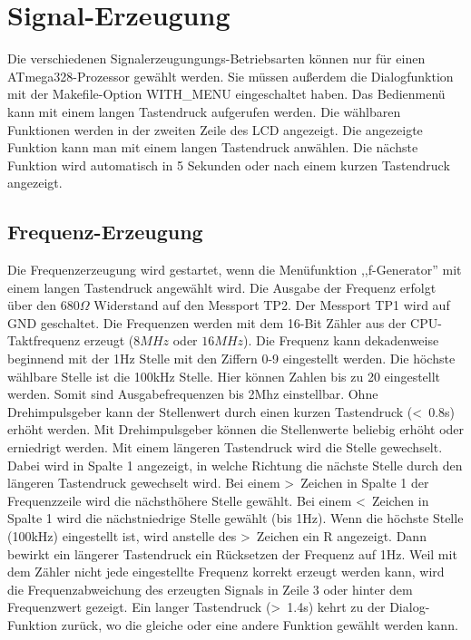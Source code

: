 \chapter{Signal-Erzeugung}

Die verschiedenen Signalerzeugungungs-Betriebsarten können nur für einen ATmega328-Prozessor
gewählt werden.
Sie müssen außerdem die Dialogfunktion mit der Makefile-Option WITH\_MENU eingeschaltet haben.
Das Bedienmenü kann mit einem langen Tastendruck aufgerufen werden.
Die wählbaren Funktionen werden in der zweiten Zeile des LCD angezeigt.
Die angezeigte Funktion kann man mit einem langen Tastendruck anwählen.
Die nächste Funktion wird automatisch in 5 Sekunden oder nach einem kurzen Tastendruck
angezeigt.

\label{sec:generation}

\section{Frequenz-Erzeugung}
Die Frequenzerzeugung wird gestartet, wenn die Menüfunktion ,,f-Generator'' mit einem
langen Tastendruck angewählt wird.
Die Ausgabe der Frequenz erfolgt über den \(680\Omega\) Widerstand auf den Messport TP2.
Der Messport TP1 wird auf GND geschaltet.
Die Frequenzen werden mit dem 16-Bit Zähler aus der CPU-Taktfrequenz erzeugt (\(8MHz\) oder \(16MHz\)).
Die Frequenz kann dekadenweise beginnend mit der 1Hz Stelle mit den Ziffern 0-9 eingestellt werden.
Die höchste wählbare Stelle ist die 100kHz Stelle. Hier können Zahlen bis zu 20 eingestellt werden.
Somit sind Ausgabefrequenzen bis 2Mhz einstellbar.
Ohne Drehimpulsgeber kann der Stellenwert durch einen kurzen Tastendruck (\textless~0.8s)
erhöht werden.
Mit Drehimpulsgeber können die Stellenwerte beliebig erhöht oder erniedrigt werden.
Mit einem längeren Tastendruck wird die Stelle gewechselt.
Dabei wird in Spalte 1 angezeigt, in welche Richtung die nächste Stelle durch den längeren
Tastendruck gewechselt wird.
Bei einem \textgreater~Zeichen in Spalte 1 der Frequenzzeile wird die nächsthöhere
Stelle gewählt.
Bei einem \textless~Zeichen in Spalte 1  wird die nächstniedrige Stelle gewählt (bis 1Hz).
Wenn die höchste Stelle (100kHz) eingestellt ist, wird anstelle des \textgreater~Zeichen
ein R angezeigt. Dann bewirkt ein längerer Tastendruck ein Rücksetzen der Frequenz auf 1Hz.
Weil mit dem Zähler nicht jede eingestellte Frequenz korrekt erzeugt werden kann,
wird die Frequenzabweichung des erzeugten Signals in Zeile 3 oder hinter dem Frequenzwert gezeigt.
Ein langer Tastendruck (\textgreater~1.4s) kehrt zu der Dialog-Funktion zurück,
wo die gleiche oder eine andere Funktion gewählt werden kann.

